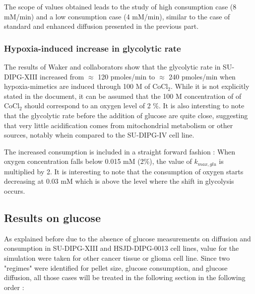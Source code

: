 \documentclass[11pt,a4paper]{article}
\begin{document}
The scope of values obtained leads to the study of high consumption case (8 mM/min) and a low consumption case (4 mM/min), similar to the case of standard and enhanced diffusion presented in the previous part. 
 

\subsubsection{Hypoxia-induced increase in glycolytic rate}
The results of Waker and collaborators show that the glycolytic rate in SU-DIPG-XIII increased from $\approx$ 120 pmoles/min to $\approx$ 240 pmoles/min when hypoxia-mimetics are induced through 100 \textmu M of CoCl$_2$. While it is not explicitly stated in the document, it can be assumed that the 100 \textmu M concentration of of CoCl$_2$ should correspond to an oxygen level of 2 \%. It is also intersting to note that the glycolytic rate before the addition of glucose are quite close, suggesting that very little acidification comes from mitochondrial metabolism or other sources, notably whein compared to the SU-DIPG-IV cell line.

The increased consumption is included in a straight forward fashion : When oxygen concentration falls below 0.015 mM (2\%), the value of $k_{max,glu}$ is multiplied by 2. It is interesting to note that the consumption of oxygen starts decreasing at 0.03 mM which is above the level where the shift in glycolysis occurs.

\newpage
\subsection{Results on glucose}
As explained before due to the absence of glucose measurements on diffusion and consumption in SU-DIPG-XIII and HSJD-DIPG-0013 cell lines, value for the simulation were taken for other cancer tissue or glioma cell line. Since two "regimes" were identified for pellet size, glucose consumption, and glucose diffusion, all those cases will be treated in the following section in the following order :
\end{document}
